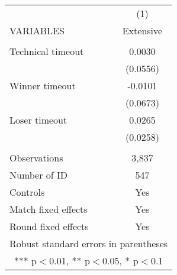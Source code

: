 \documentclass[]{article}
\begin{document}
\begin{tabular}{lc} \hline
 & (1) \\
VARIABLES & Extensive \\ \hline
 &  \\
Technical timeout & 0.0030 \\
 & (0.0556) \\
Winner timeout & -0.0101 \\
 & (0.0673) \\
Loser timeout & 0.0265 \\
 & (0.0258) \\
 &  \\
Observations & 3,837 \\
Number of ID & 547 \\
Controls & Yes \\
Match fixed effects & Yes \\
 Round fixed effects & Yes \\ \hline
\multicolumn{2}{c}{ Robust standard errors in parentheses} \\
\multicolumn{2}{c}{ *** p$<$0.01, ** p$<$0.05, * p$<$0.1} \\
\end{tabular}
\end{document}
